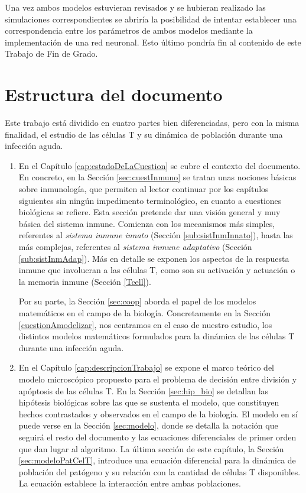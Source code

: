 Una vez ambos modelos estuvieran revisados y se hubieran realizado las simulaciones correspondientes se abriría la posibilidad de intentar establecer una correspondencia entre los parámetros de ambos modelos mediante la implementación de una red neuronal. Esto último pondría fin al contenido de este Trabajo de Fin de Grado.


\section{Estructura del documento}

Este trabajo está dividido en cuatro partes bien diferenciadas, pero con la misma finalidad, el estudio de las células T y su dinámica de población durante una infección aguda. 

\begin{enumerate}
	\item En el Capítulo \ref{cap:estadoDeLaCuestion} se cubre el contexto del documento. En concreto, en la Sección \ref{sec:cuestInmuno} se tratan unas nociones básicas sobre inmunología, que permiten al lector continuar por los capítulos siguientes sin ningún impedimento terminológico, en cuanto a cuestiones biológicas se refiere. Esta sección pretende dar una visión general y muy básica del sistema inmune. Comienza con los mecanismos más simples, referentes al \textit{sistema inmune innato} (Sección \ref{sub:sistInmInnato}), hasta las más complejas, referentes al \textit{sistema inmune adaptativo} (Sección \ref{sub:sistInmAdap}). Más en detalle se exponen los aspectos de la respuesta inmune que involucran a las células T, como son su activación y actuación o la memoria inmune (Sección \ref{Tcell}). 
	
	Por su parte, la Sección \ref{sec:coop} aborda el papel de los modelos matemáticos en el campo de la biología. Concretamente en la Sección \ref{cuestionAmodelizar}, nos centramos en el caso de nuestro estudio, los distintos modelos matemáticos formulados para la dinámica de las células T durante una infección aguda.
	 
	
	\item En el Capítulo \ref{cap:descripcionTrabajo} se expone el marco teórico del modelo microscópico propuesto para el problema de decisión entre división y apóptosis de las células T. En la Sección \ref{sec:hip_bio} se detallan las hipótesis biológicas sobre las que se sustenta el modelo, que constituyen hechos contrastados y observados en el campo de la biología. El modelo en sí puede verse en la Sección \ref{sec:modelo}, donde se detalla la notación que seguirá el resto del documento y las ecuaciones diferenciales de primer orden que dan lugar al algoritmo. La última sección de este capítulo, la Sección \ref{sec:modeloPatCelT}, introduce una ecuación diferencial para la dinámica de población del patógeno y su relación con la cantidad de células T disponibles. La ecuación establece la interacción entre ambas poblaciones.
	

\end{enumerate}
